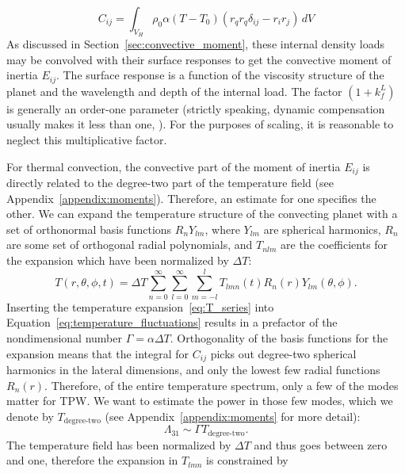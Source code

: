 \documentclass[preprint,12pt,authoryear]{elsarticle}
\begin{document}
\begin{equation}
C_{ij} = \int_{V_H} \rho_0 \alpha (T-T_0) \left( r_q r_q \delta_{ij} - r_i r_j \right) \,dV
\label{eq:temperature_fluctuations}
\end{equation}
As discussed in Section~\ref{sec:convective_moment}, these internal density loads may be convolved with their surface responses to get the convective moment of inertia $E_{ij}$.
The surface response is a function of the viscosity structure of the planet and the wavelength and depth of the internal load.
The factor $(1+k^L_f)$ is generally an order-one parameter 
(strictly speaking, dynamic compensation usually makes it less than one, \citep[e.g.][]{richards1984geoid}). 
For the purposes of scaling, it is reasonable to neglect this multiplicative factor.

For thermal convection, the convective part of the moment of inertia $E_{ij}$ is directly related to the degree-two part of the temperature field (see Appendix~\ref{appendix:moments}).
Therefore, an estimate for one specifies the other.
We can expand the temperature structure of the convecting planet with a set of orthonormal basis functions $R_n Y_{lm}$, 
where $Y_{lm}$ are spherical harmonics, $R_n$ are some set of orthogonal radial polynomials, and
$T_{nlm}$ are the coefficients for the expansion which have been normalized by $\Delta T$:
\begin{equation} 
T( r , \theta, \phi, t )  = \Delta T {\displaystyle \sum_{n=0}^\infty \sum_{l=0}^\infty \sum_{m=-l}^{l} } T_{lmn}(t) R_n(r) Y_{lm} (\theta , \phi).
\label{eq:T_series}
\end{equation}
Inserting the temperature expansion~\eqref{eq:T_series} into Equation~\eqref{eq:temperature_fluctuations} results in 
a prefactor of the nondimensional number $\Gamma = \alpha \Delta T$.
Orthogonality of the basis functions for the expansion means that the integral for $C_{ij}$ picks out degree-two 
spherical harmonics in the lateral dimensions, and only the lowest few radial functions $R_n(r)$.
Therefore, of the entire temperature spectrum, only a few of the modes matter for TPW.
We want to estimate the power in those few modes, which we denote by $T_{\text{degree-two}}$ (see Appendix~\ref{appendix:moments} for more detail): 
\begin{equation}
\Lambda_{31} \sim \Gamma T_{\text{degree-two}}.
\end{equation}
The temperature field has been normalized by $\Delta T$ and thus goes between zero and one, therefore the expansion in $T_{lmn}$ is constrained by
\end{document}
